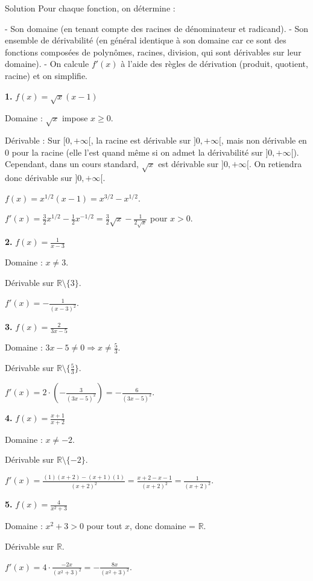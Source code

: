 \documentclass[a4paper,12pt]{article}
\begin{document}
\begin{solutionbox}{Solution}
Pour chaque fonction, on détermine :

- Son domaine (en tenant compte des racines de dénominateur et radicand).
- Son ensemble de dérivabilité (en général identique à son domaine car ce sont des fonctions composées de polynômes, racines, division, qui sont dérivables sur leur domaine).
- On calcule $f'(x)$ à l’aide des règles de dérivation (produit, quotient, racine) et on simplifie.

\textbf{1.} $f(x)=\sqrt{x}(x - 1)$

Domaine : $\sqrt{x}$ impose $x \geq 0$.

Dérivable : Sur $[0,+\infty[$, la racine est dérivable sur $]0,+\infty[$, mais non dérivable en 0 pour la racine (elle l’est quand même si on admet la dérivabilité sur $]0,+\infty[$). Cependant, dans un cours standard, $\sqrt{x}$ est dérivable sur $]0,+\infty[$. On retiendra donc dérivable sur $]0,+\infty[$.

$f(x)=x^{1/2}(x - 1)=x^{3/2}-x^{1/2}$.

$f'(x)=\frac{3}{2}x^{1/2}-\frac{1}{2}x^{-1/2}=\frac{3}{2}\sqrt{x}-\frac{1}{2\sqrt{x}}$ pour $x>0$.

\textbf{2.} $f(x)=\frac{1}{x -3}$

Domaine : $x \neq 3$.

Dérivable sur $\mathbb{R}\setminus\{3\}$.

$f'(x)=-\frac{1}{(x-3)^2}$.

\textbf{3.} $f(x)=\frac{2}{3x-5}$

Domaine : $3x-5 \neq 0 \Rightarrow x \neq \frac{5}{3}$.

Dérivable sur $\mathbb{R}\setminus\{\frac{5}{3}\}$.

$f'(x)=2 \cdot \left(-\frac{3}{(3x-5)^2}\right)=-\frac{6}{(3x-5)^2}$.

\textbf{4.} $f(x)=\frac{x+1}{x+2}$

Domaine : $x \neq -2$.

Dérivable sur $\mathbb{R}\setminus\{-2\}$.

$f'(x)=\frac{(1)(x+2)-(x+1)(1)}{(x+2)^2}=\frac{x+2 - x -1}{(x+2)^2}=\frac{1}{(x+2)^2}$.

\textbf{5.} $f(x)=\frac{4}{x^2+3}$

Domaine : $x^2+3>0$ pour tout $x$, donc domaine = $\mathbb{R}$.

Dérivable sur $\mathbb{R}$.

$f'(x)=4 \cdot \frac{-2x}{(x^2+3)^2}=-\frac{8x}{(x^2+3)^2}$.


\end{solutionbox}
\end{document}
